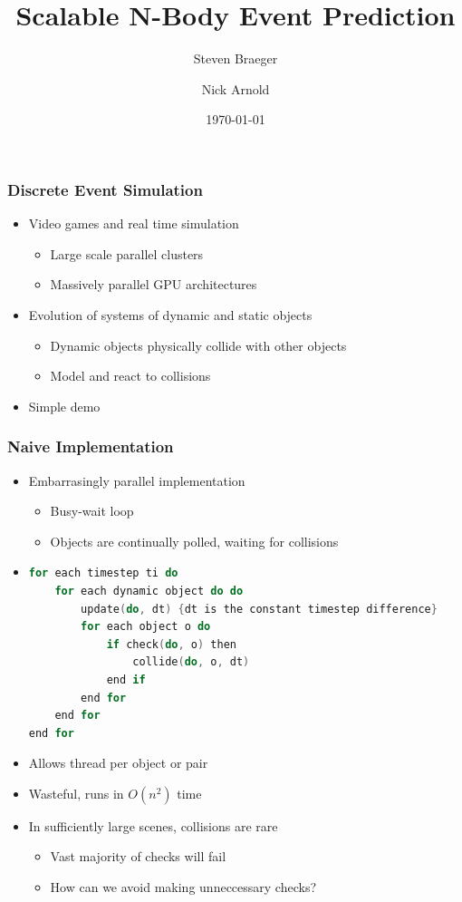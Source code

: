\documentclass{beamer}
\title{Scalable N-Body Event Prediction}
\author
{Steven Braeger \and Nick Arnold}
\institute
{
  \inst{1}%
  University of Central Florida
}
\date
{\today}
\begin{document}
\frame{\titlepage}

\begin{frame}
	\frametitle{Discrete Event Simulation}
	\begin{itemize}
		\item Video games and real time simulation
		\begin{itemize}
			\item Large scale parallel clusters
			\item Massively parallel GPU architectures
		\end{itemize}
		\item Evolution of systems of dynamic and static objects
		\begin{itemize}
			\item Dynamic objects physically collide with other objects
			\item Model and react to collisions
		\end{itemize}
		\item Simple demo
	\end{itemize}
\end{frame}

\begin{frame}[fragile]
	\frametitle{Naive Implementation}
	\begin{itemize}
		\item Embarrasingly parallel implementation
		\begin{itemize}
			\item Busy-wait loop
			\item Objects are continually polled, waiting for collisions
		\end{itemize}
		\item
	\begin{lstlisting}[language=C,basicstyle=\footnotesize,frame=single,tabsize=4,title=Naive\_Algorithm]
for each timestep ti do
    for each dynamic object do do
        update(do, dt) {dt is the constant timestep difference}
        for each object o do
            if check(do, o) then
                collide(do, o, dt)
            end if
        end for
    end for
end for
	\end{lstlisting}
		\item Allows thread per object or pair
		\item Wasteful, runs in $O(n ^ 2)$ time 
		\item In sufficiently large scenes, collisions are rare
		\begin{itemize}
			\item Vast majority of checks will fail
			\item How can we avoid making unneccessary checks?
		\end{itemize}
	\end{itemize}

\end{frame}
\end{document}
